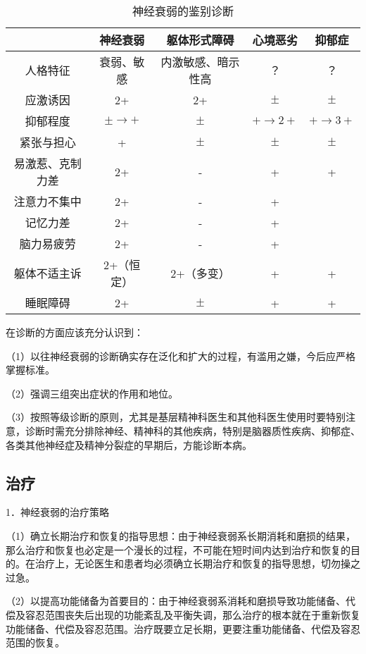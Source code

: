 \begin{table}
    \centering
    \caption{神经衰弱的鉴别诊断}
    \label{tab11-3}
    \begin{tabular}{ccccc}
    \toprule
    & 神经衰弱 & 躯体形式障碍 & 心境恶劣 & 抑郁症 \\
    \midrule
    人格特征 & 衰弱、敏感 & 内激敏感、暗示性高 & ？ & ？\\
    应激诱因 & 2+ & 2+ & $\pm$ & $\pm$\\
    抑郁程度 & $\pm\rightarrow+$ & $\pm$ & $+\rightarrow 2+$ &  $+\rightarrow 3+$\\
    紧张与担心 & + & $\pm$ & $\pm$ & $\pm$\\
    易激惹、克制力差 & 2+ & - & + & +\\
    注意力不集中 & 2+ & - & + &\\
    记忆力差  & 2+ & - & + &\\
    脑力易疲劳  & 2+ & - & + &\\
    躯体不适主诉 & 2+（恒定） & 2+（多变） & + & +\\
    睡眠障碍 & 2+ & $\pm$ & + & +\\
    \bottomrule
    \end{tabular}
    \end{table}

在诊断的方面应该充分认识到：

（1）以往神经衰弱的诊断确实存在泛化和扩大的过程，有滥用之嫌，今后应严格掌握标准。

（2）强调三组突出症状的作用和地位。

（3）按照等级诊断的原则，尤其是基层精神科医生和其他科医生使用时要特别注意，诊断时需充分排除神经、精神科的其他疾病，特别是脑器质性疾病、抑郁症、各类其他神经症及精神分裂症的早期后，方能诊断本病。

\subsection{治疗}

1．神经衰弱的治疗策略

（1）确立长期治疗和恢复的指导思想：由于神经衰弱系长期消耗和磨损的结果，那么治疗和恢复也必定是一个漫长的过程，不可能在短时间内达到治疗和恢复的目的。在治疗上，无论医生和患者均必须确立长期治疗和恢复的指导思想，切勿操之过急。

（2）以提高功能储备为首要目的：由于神经衰弱系消耗和磨损导致功能储备、代偿及容忍范围丧失后出现的功能紊乱及平衡失调，那么治疗的根本就在于重新恢复功能储备、代偿及容忍范围。治疗既要立足长期，更要注重功能储备、代偿及容忍范围的恢复。

